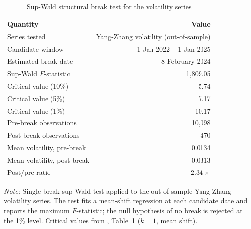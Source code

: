 \begin{table}[htbp]
\centering
\small
\caption{Sup-Wald structural break test for the volatility series}
\label{tab:break-test}
\begin{tabular}{lr}
\toprule
\textbf{Quantity} & \textbf{Value} \\
\midrule
Series tested & Yang-Zhang volatility (out-of-sample) \\
Candidate window & 1 Jan 2022 -- 1 Jan 2025 \\
Estimated break date & 8 February 2024 \\
Sup-Wald $F$-statistic & 1{,}809.05 \\
Critical value (10\%) & 5.74 \\
Critical value (5\%) & 7.17 \\
Critical value (1\%) & 10.17 \\
Pre-break observations & 10{,}098 \\
Post-break observations & 470 \\
Mean volatility, pre-break & 0.0134 \\
Mean volatility, post-break & 0.0313 \\
Post/pre ratio & $2.34\times$ \\
\bottomrule
\end{tabular}
\par\smallskip
{\footnotesize\textit{Note:} Single-break sup-Wald test
\parencite{andrews1993tests} applied to the out-of-sample Yang-Zhang
volatility series. The test fits a mean-shift regression at each candidate
date and reports the maximum $F$-statistic; the null hypothesis of no break
is rejected at the 1\% level. Critical values from \textcite{andrews1993tests},
Table~1 ($k = 1$, mean shift).}
\end{table}

